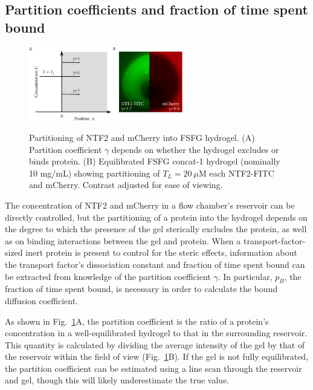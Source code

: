 \subsection{Partition coefficients and fraction of time spent bound}
\label{sec:part-coeff}

\begin{figure} 
\caption{Partitioning of NTF2 and mCherry into FSFG hydrogel.  (A) Partition coefficient $\gamma$ depends on whether the hydrogel excludes or binds protein. (B) Equilibrated FSFG concat-1 hydrogel (nominally 10 mg/mL) showing partitioning of $T_L = 20\ \mu$M each NTF2-FITC and mCherry.  Contrast adjusted for ease of viewing.\\}
\centering
\includegraphics[width=0.6\textwidth]{figs/ch04/partition.pdf}
\label{fig:partition}
\end{figure}

The concentration of NTF2 and mCherry in a flow chamber's reservoir can be directly controlled, but the partitioning of a protein into the hydrogel depends on the degree to which the presence of the gel sterically excludes the protein, as well as on binding interactions between the gel and protein.  When a transport-factor-sized inert protein is present to control for the steric effects, information about the transport factor's dissociation constant and fraction of time spent bound can be extracted from knowledge of the partition coefficient $\gamma$.  In particular, $p_B$, the fraction of time spent bound, is necessary in order to calculate the bound diffusion coefficient.

As shown in Fig.~\ref{fig:partition}A, the partition coefficient is the ratio of a protein's concentration in a well-equilibrated hydrogel to that in the surrounding reservoir.  This quantity is calculated by dividing the average intensity of the gel by that of the reservoir within the field of view (Fig.~\ref{fig:partition}B).  If the gel is not fully equilibrated, the partition coefficient can be estimated using a line scan through the reservoir and gel, though this will likely underestimate the true value.

